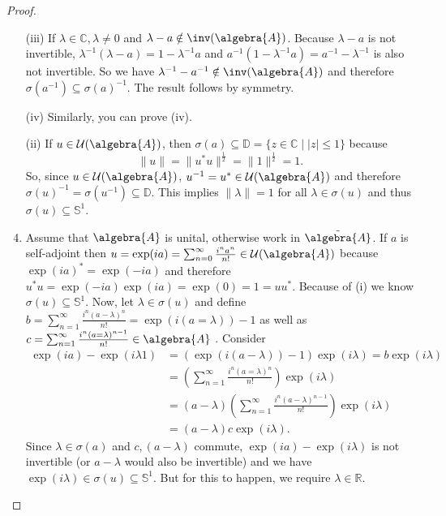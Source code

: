 \documentclass[a4paper]{article}
\newcommand{\unitcircle}{\mathds{S}^1}
\begin{document}
\begin{proof}
	\begin{enumerate}
		\item[(iii)] If $\lambda \in \mathds{C}, \lambda \neq 0$ and $\lambda - a \notin \inv(\algebra{A})$.
		Because $\lambda - a$ is not invertible, $\lambda^{-1}(\lambda - a) = 1 - \lambda^{-1} a$ and $a^{-1}(1 - \lambda^{-1} a) = a^{-1} - \lambda^{-1}$ is also not invertible.
		So we have $\lambda^{-1} - a^{-1} \notin \inv(\algebra{A})$ and therefore $\sigma(a^{-1}) \subseteq \sigma(a)^{-1}$.
		The result follows by symmetry.
		\item[(iv)] Similarly, you can prove (iv).
		\item[(ii)] If $u \in \mathcal{U}(\algebra{A})$, then $\sigma(a) \subseteq \mathds{D} = \{z \in \mathds{C} \mid |z| \leq 1 \}$ because 
		\begin{equation*}
			\|u\| = \|u^* u\|^{\frac{1}{2}} = \|1\|^\frac{1}{2} = 1\text{.}
		\end{equation*}
		So, since $u \in \mathcal{U}(\algebra{A})$, $u^{-1}=u^* \in \mathcal{U}(\algebra{A})$ and therefore $\sigma(u)^{-1} = \sigma(u^{-1}) \subseteq \mathds{D}$.
		This implies $\|\lambda\| = 1$ for all $\lambda \in \sigma(u)$ and thus $\sigma(u) \subseteq \unitcircle$.
		\item Assume that $\algebra{A}$ is unital, otherwise work in $\tilde{\algebra{A}}$. If $a$ is self-adjoint then $u = \exp(i a) = \sum_{n=0}^{\infty} \frac{i^n a^n}{n!} \in \mathcal{U}(\algebra{A})$ because $
		\exp(i a)^* = \exp(- i a)$ and therefore $u^* u = \exp(-i a) \exp(i a) = \exp(0) = 1 = u u^*$.
		Because of (i) we know $\sigma(u) \subseteq \unitcircle$.
		Now, let $\lambda \in \sigma(u)$ and define $b = \sum_{n=1}^{\infty} \frac{i^n (a-\lambda)^n}{n!} = \exp(i(a = \lambda)) - 1$ as well as $c = \sum_{n = 1}^{\infty} \frac{i^n (a = \lambda)^{n-1}}{n!} \in \algebra{A}$ .
		Consider
		\begin{align*}
			\exp(i a) - \exp(i \lambda 1) &= (\exp(i (a - \lambda)) - 1)  \exp(i \lambda) = b \exp(i \lambda)\\
			&= \left( \sum_{n = 1}^{\infty} \frac{i^n (a = \lambda)^n}{n!} \right) \exp(i \lambda) \\ 
			&= (a - \lambda) \left( \sum_{n = 1}^{\infty} \frac{i^n (a - \lambda)^{n-1}}{n!} \right) \exp(i \lambda)\\
			&= (a - \lambda) c \exp(i \lambda)\text{.}
		\end{align*}
		Since $\lambda \in \sigma(a)$ and $c, (a - \lambda)$ commute, $\exp(i a) - \exp(i \lambda)$ is not invertible (or $a - \lambda$ would also be invertible) and we have $\exp(i \lambda) \in \sigma(u) \subseteq \unitcircle$.
		But for this to happen, we require $\lambda \in \mathds{R}$.
	\end{enumerate}
\end{proof}
\end{document}
